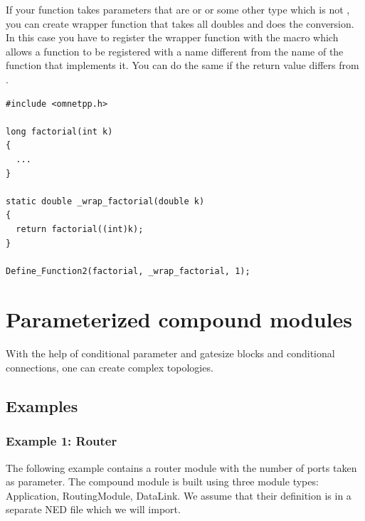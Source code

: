 If your function takes parameters that are  or  or
some other type which is not , you can create wrapper function
that takes all doubles and does the conversion. In this case you have
to register the wrapper function with the  macro
which allows a function to be registered with a name different from the
name of the function that implements it. You can do the same
if the return value differs from .

\begin{verbatim}
#include <omnetpp.h>

long factorial(int k)
{
  ...
}

static double _wrap_factorial(double k)
{
  return factorial((int)k);
}

Define_Function2(factorial, _wrap_factorial, 1);
\end{verbatim}



\section{Parameterized compound modules}


With the help of conditional parameter and gatesize blocks and
conditional connections, one can
create complex topologies.


\subsection{Examples}

\subsubsection{Example 1: Router}

The following example contains a router module with the number of
ports taken as parameter. The compound module is built using three
module types: Application, RoutingModule, DataLink. We assume that
their definition is in a separate NED file which we will import.


